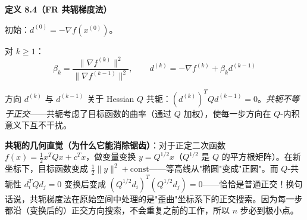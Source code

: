 \begin{defbox}
\textbf{定义 8.4（FR 共轭梯度法）}

初始：$d^{(0)} = -\nabla f(x^{(0)})$。

对 $k \ge 1$：
\[
\beta_k = \frac{\|\nabla f^{(k)}\|^2}{\|\nabla f^{(k-1)}\|^2},\qquad
d^{(k)} = -\nabla f^{(k)} + \beta_k d^{(k-1)}
\]

方向 $d^{(k)}$ 与 $d^{(k-1)}$ 关于 Hessian $Q$ 共轭：$(d^{(k)})^T Q d^{(k-1)} = 0$。\emph{共轭不等于正交}——共轭考虑了目标函数的曲率（通过 $Q$ 加权），使每一步方向在 $Q$-内积意义下互不干扰。

\textbf{共轭的几何直觉（为什么它能消除锯齿）}：对于正定二次函数 $f(x)=\frac12 x^T Q x + c^T x$，做变量变换 $y = Q^{1/2}x$（$Q^{1/2}$ 是 $Q$ 的平方根矩阵）。在新坐标下，目标函数变成 $\frac12\|y\|^2 + \text{const}$——等高线从"椭圆"变成"正圆"。而 $Q$-共轭性 $d_i^T Q d_j = 0$ 变换后变成 $(Q^{1/2}d_i)^T (Q^{1/2}d_j) = 0$——恰恰是普通正交！换句话说，共轭梯度法在原始空间中处理的是"歪曲"坐标系下的正交搜索。因为每一步都沿（变换后的）正交方向搜索，不会重复之前的工作，所以 $n$ 步必到极小点。
\end{defbox}

